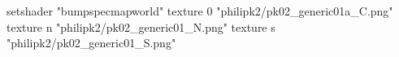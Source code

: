 setshader "bumpspecmapworld"
    texture 0 "philipk2/pk02_generic01a_C.png"
    texture n "philipk2/pk02_generic01_N.png"
    texture s "philipk2/pk02_generic01_S.png"